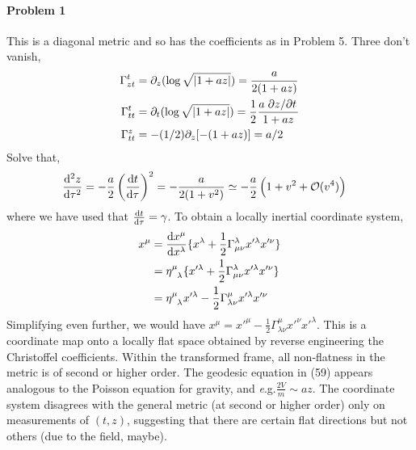 \documentclass[10pt]{scrartcl}
\newcommand{\eg}{{\textit e.g.}}
\begin{document}
\paragraph{Problem 1}
This is a diagonal metric and so has the coefficients as in Problem 5. Three don't vanish,
\begin{align}
\Gamma_{zt}^{t} &= \partial_z(\log\sqrt{\abs{1 + a z}})=\frac{a}{2(1+a z)}\\
\Gamma_{tt}^{t} &= \partial_t(\log\sqrt{\abs{1 + a z}})= \frac{1}{2}\frac{a\pdv*{z}{t}}{1 + a z}\\
\Gamma_{tt}^{z} &= -(1/2)\partial_z [-(1+a z)] = a/2
\end{align}
Solve that,
\begin{align}
\dv[2]{z}{\tau}	 &= -\frac{a}{2}\left(\dv{t}{\tau}\right)^2= -\frac{a}{2(1+v^2)}\simeq -\frac{a}{2}\left(1 + v^2 + \mathcal{O}(v^4)\right)
\end{align}
where we have used that $\dv{t}{\tau}=\gamma$. To obtain a locally inertial coordinate system, 
\begin{align}
x^{\mu} &= \dv{x^{\mu}}{x^{\lambda}}\{x^{\lambda}	+ \frac{1}{2}\Gamma_{\mu\nu}^{\lambda}x'^{\lambda} x'^{\nu}\}\\
&=  \tensor{\eta}{^\mu_\lambda}\{x'^{\lambda}	+ \frac{1}{2}\Gamma_{\mu\nu}^{\lambda}x'^{\lambda} x'^{\nu}\}\\
&= \tensor{\eta}{^\mu_\lambda}x'^{\lambda} -\frac{1}{2}\Gamma_{\lambda\nu}^{\mu} x'^{\lambda} x'^{\nu}
\end{align}
Simplifying even further, we would have $x^{\mu} = x'^{\mu} - \frac{1}{2}\Gamma_{\lambda\nu}^{\mu}x'^{\nu}x'^{\lambda}$. This is a coordinate map onto a locally flat space obtained by reverse engineering the Christoffel coefficients. Within the transformed frame, all non-flatness in the metric is of second or higher order. The geodesic equation in (59) appears analogous to the Poisson equation for gravity, and \eg  $\frac{2V}{m}\sim a z$.  The coordinate system disagrees with the general metric (at second or higher order) only on measurements of $(t, z)$, suggesting that there are certain flat directions but not others (due to the field, maybe). 
\end{document}
